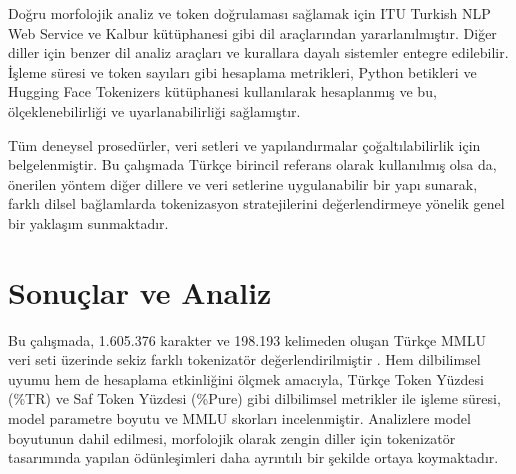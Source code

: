 \documentclass{article}
\begin{document}
Doğru morfolojik analiz ve token doğrulaması sağlamak için ITU Turkish NLP Web Service \cite{eryigit_itu_2014} ve Kalbur kütüphanesi \cite{aksoy_ahmetaxkalbur_2024} gibi dil araçlarından yararlanılmıştır. Diğer diller için benzer dil analiz araçları ve kurallara dayalı sistemler entegre edilebilir. İşleme süresi ve token sayıları gibi hesaplama metrikleri, Python betikleri ve Hugging Face Tokenizers kütüphanesi \cite{neubeck_so_2024} kullanılarak hesaplanmış ve bu, ölçeklenebilirliği ve uyarlanabilirliği sağlamıştır.

Tüm deneysel prosedürler, veri setleri ve yapılandırmalar çoğaltılabilirlik için belgelenmiştir. Bu çalışmada Türkçe birincil referans olarak kullanılmış olsa da, önerilen yöntem diğer dillere ve veri setlerine uygulanabilir bir yapı sunarak, farklı dilsel bağlamlarda tokenizasyon stratejilerini değerlendirmeye yönelik genel bir yaklaşım sunmaktadır.

\section{Sonuçlar ve Analiz}

Bu çalışmada, 1.605.376 karakter ve 198.193 kelimeden oluşan Türkçe MMLU veri seti üzerinde sekiz farklı tokenizatör değerlendirilmiştir \cite{bayram_turkish_nodate}. Hem dilbilimsel uyumu hem de hesaplama etkinliğini ölçmek amacıyla, Türkçe Token Yüzdesi (\%TR) ve Saf Token Yüzdesi (\%Pure) gibi dilbilimsel metrikler ile işleme süresi, model parametre boyutu ve MMLU skorları incelenmiştir. Analizlere model boyutunun dahil edilmesi, morfolojik olarak zengin diller için tokenizatör tasarımında yapılan ödünleşimleri daha ayrıntılı bir şekilde ortaya koymaktadır.
\end{document}
